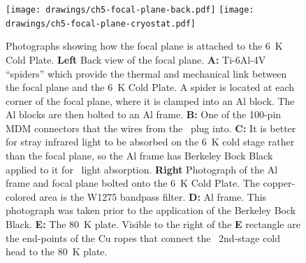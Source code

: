 \begin{figure}
\centering
\texttt{[image: drawings/ch5-focal-plane-back.pdf]}
\texttt{[image: drawings/ch5-focal-plane-cryostat.pdf]}
\caption[Photograph of focal plane in cryostat]{
  Photographs showing how the focal plane is attached to the \SI{6}{\K} Cold Plate.
  \textbf{Left}
  Back view of the focal plane.
  \textbf{A:} Ti-6Al-4V ``spiders'' which provide the thermal and mechanical link between the focal plane and the \SI{6}{\K} Cold Plate.
  A spider is located at each corner of the focal plane, where it is clamped into an Al block.
  The Al blocks are then bolted to an Al frame.
  \textbf{B:} One of the 100-pin MDM connectors that the wires from the \MCE\ plug into.
  \textbf{C:} It is better for stray infrared light to be absorbed on the \SI{6}{\K} cold stage rather than the focal plane, so the Al frame has Berkeley Bock Black \cite{persky_review_1999} applied to it for \IR\ light absorption.
  \textbf{Right}
  Photograph of the Al frame and focal plane bolted onto the \SI{6}{\K} Cold Plate.
  The copper-colored area is the W1275 bandpass filter.
  \textbf{D:} Al frame.
  This photograph was taken prior to the application of the Berkeley Bock Black.
  \textbf{E:} The \SI{80}{\K} plate.
  Visible to the right of the \textbf{E} rectangle are the end-points of the Cu ropes that connect the \PTC\ 2nd-stage cold head to the \SI{80}{\K} plate.
}
\label{fig:ch5-focal-plane-back}
\end{figure}


